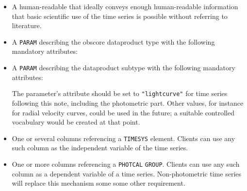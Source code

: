 \documentclass[11pt,a4paper]{ivoa} 
\let\fg=\color
\def\elem#1{{\tt{\fg{DarkRed}#1}}}
\def\attrval#1#2{{\tt{\fg{DarkRed}#1}="{\fg{DarkPurple}#2}"}}
\def\attrvalonly#1{{\tt"{\fg{DarkPurple}#1}"}}
\begin{document}
\begin{itemize}
\item A human-readable  that ideally conveys enough
  human-readable information that basic scientific use of the time
  series is possible without referring to literature.

\item A \elem{PARAM} describing the obscore dataproduct type with the
  following mandatory attributes:

\item A \elem{PARAM} describing the dataproduct subtype with the
  following mandatory attributes:


The parameter's  attribute should be set to
\attrvalonly{lightcurve} for time series following this note, including the
photometric part.  Other values, for instance for radial velocity
curves, could be used in the future; a suitable controlled vocabulary
would be created at that point.

     \item One or several columns referencing a \elem{TIMESYS}
       element.  Clients can use any such column as the independent
       variable of the time series.

     \item One or more columns referencing a \texttt{PHOTCAL}
       \elem{GROUP}.  Clients can use any such column as a dependent
       variable of a time series.  Non-photometric time series will
       replace this mechanism some some other requirement.
\end{itemize}
\end{document}
